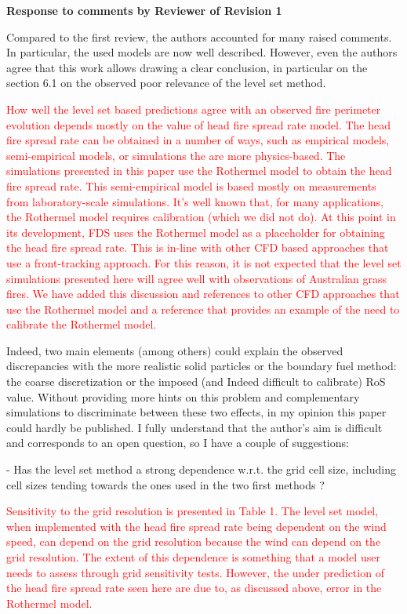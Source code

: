 \documentclass[12pt]{article}
\newcommand\hl[1]{\textcolor{red}{#1}}
\begin{document}
\begin{center}
{\bf Response to comments by Reviewer of Revision 1}
\end{center}

Compared to the first review, the authors accounted for many raised comments. In particular, the used models are now well described. However, even the authors agree that this work allows drawing a clear conclusion, in particular on the section 6.1 on the observed poor relevance of the level set method.

\hl{How well the level set based predictions agree with an observed fire perimeter evolution depends mostly on the value of head fire spread rate model. The head fire spread rate can be obtained in a number of ways, such as empirical models, semi-empirical models, or simulations the are more physics-based. The simulations presented in this paper use the Rothermel model to obtain the head fire spread rate. This semi-empirical model is based mostly on measurements from laboratory-scale simulations. It's well known that, for many applications, the Rothermel model requires calibration (which we did not do). At this point in its development, FDS uses the Rothermel model as a placeholder for obtaining the head fire spread rate. This is in-line with other CFD based approaches that use a front-tracking approach. For this reason, it is not expected that the level set simulations presented here will agree well with observations of Australian grass fires. We have added this discussion and references to other CFD approaches that use the Rothermel model and a reference that provides an example of the need to calibrate the Rothermel model.}

Indeed, two main elements (among others) could explain the observed discrepancies with the more realistic solid particles or the boundary fuel method: the coarse discretization or the imposed (and Indeed difficult to calibrate) RoS value. Without providing more hints on this problem and complementary simulations to discriminate between these two effects, in my opinion this paper could hardly be published. I fully understand that the author's aim is difficult and corresponds to an open question, so I have a couple of suggestions:

- Has the level set method a strong dependence w.r.t. the grid cell size, including cell sizes tending towards the ones used in the two first methods ?

\hl{Sensitivity to the grid resolution is presented in Table 1. The level set model, when implemented with the head fire spread rate being dependent on the wind speed, can depend on the grid resolution because the wind can depend on the grid resolution. The extent of this dependence is something that a model user needs to assess through grid sensitivity tests. However, the under prediction of the head fire spread rate seen here are due to, as discussed above, error in the Rothermel model.}
\end{document}
